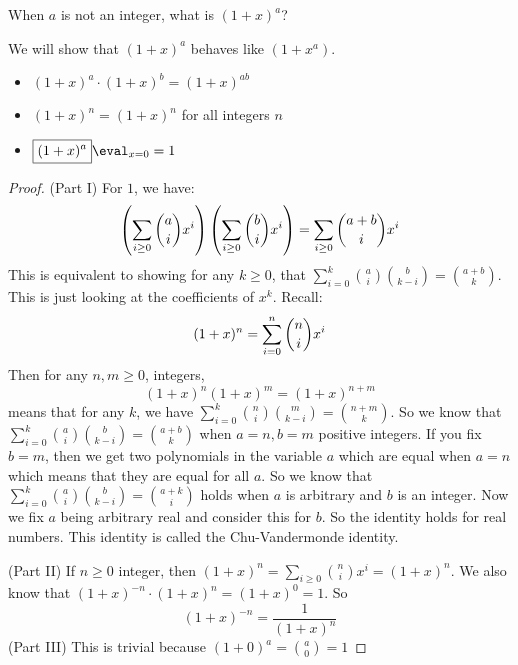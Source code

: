 \documentclass{report}
\begin{document}
When $a$ is not an integer, what is $(1 + x)^{a}$?

\begin{theorem}{}
    We will show that $\boxed{(1 + x)^{a}}$ behaves like $(1 + x^{a})$. 
        \begin{itemize}
            \item $\boxed{(1 + x)^{a}} \cdot \boxed{(1 + x)^{b}} = \boxed{(1 + x)^{ab}}$

            \item $\boxed{(1 + x)^{n}} = (1 + x)^{n}$ for all integers $n$

            \item $\boxed{(1 + x)^{a}}\eval_{x =0} = 1$ 
        \end{itemize}
\end{theorem}
    \begin{proof}
        (Part I) For $1$, we have:
            \begin{equation*}
                \left(\sum_{i \geq 0}\dbinom{a}{i}x^{i}\right)\left(\sum_{i \geq 0}\dbinom{b}{i}x^{i}\right) = \sum_{i \geq 0}\dbinom{a + b}{i}x^{i}
            \end{equation*}
        This is equivalent to showing for any $k \geq 0$, that $\sum_{i = 0}^{k}\binom{a}{i}\binom{b}{k - i} = \binom{a + b}{k}$. This is just looking at the coefficients of $x^{k}$. Recall:
            \begin{equation*}
                (1 + x)^{n} = \sum_{i = 0}^{n}\dbinom{n}{i}x^{i}
            \end{equation*}
        Then for any $n, m \geq 0$, integers, 
            \begin{equation*}
                (1 + x)^{n}(1 + x)^{m} = (1 + x)^{n+ m} 
            \end{equation*}
        means that for any $k$, we have $\sum_{i = 0}^{k}\binom{n}{i}\binom{m}{k - i} = \binom{n + m}{k}$. So we know that $\sum_{i = 0}^{k}\binom{a}{i}\binom{b}{k - i} = \binom{a + b}{k}$ when $a = n, b = m$ positive integers. If you fix $b = m$, then we get two polynomials in the variable $a$ which are equal when $a = n$ which means that they are equal for all $a$. So we know that $\sum_{i = 0}^{k}\binom{a}{i}\binom{b}{k - i} = \binom{a + k}{i}$ holds when $a$ is arbitrary and $b$ is an integer. Now we fix $a$ being arbitrary real and consider this for $b$. So the identity holds for real numbers. This identity is called the Chu-Vandermonde identity.

        (Part II) If $n \geq 0$ integer, then $\boxed{(1 + x)^{n}} = \sum_{i \geq 0}\binom{n}{i}x^{i} = (1 + x)^{n}$. We also know that $\boxed{(1 + x)^{-n}}\cdot \boxed{(1 + x)^{n}} = \boxed{(1 + x)^{0}} = 1$. So
            \begin{equation*}
                \boxed{(1 + x)^{-n}} = \dfrac{1}{(1 + x)^{n}}
            \end{equation*}
        (Part III) This is trivial because $\boxed{(1 + 0)^{a}} = \binom{a}{0} = 1$
    \end{proof}
\end{document}
